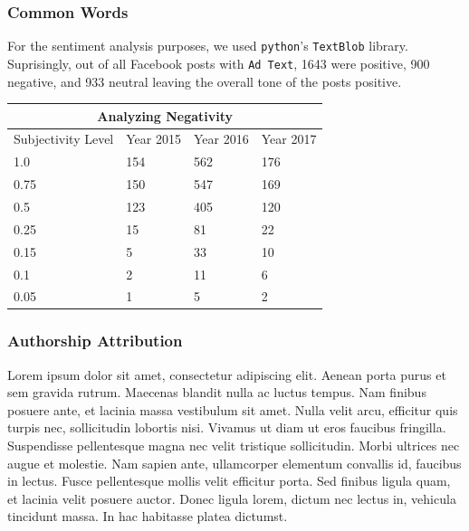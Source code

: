 \documentclass[11pt]{article}
\theoremstyle{definition}
\begin{document}
\subsubsection*{\centering Common Words}
For the sentiment analysis purposes, we used \texttt{python}'s \texttt{TextBlob}
library. Suprisingly, out of all Facebook posts with \texttt{Ad Text}, 1643 were
positive, 900 negative, and 933 neutral leaving the overall tone of the posts
positive.

\begin{center}
\begin{tabular}{ |p{3cm}|p{3cm}|p{3cm}|p{3cm}|  }
 \hline
 \multicolumn{4}{|c|}{Analyzing Negativity} \\
 \hline
 Subjectivity Level & Year 2015 & Year 2016 & Year 2017\\
 \hline
 1.0  & 154 & 562 & 176\\
 0.75 & 150 & 547 & 169\\
 0.5  & 123 & 405 & 120\\
 0.25 & 15  & 81  & 22 \\
 0.15 & 5   & 33  & 10 \\
 0.1  & 2   & 11  & 6  \\
 0.05 & 1   & 5   & 2  \\
 \hline
\end{tabular}
\end{center}



\subsubsection*{\centering Authorship Attribution}

Lorem ipsum dolor sit amet, consectetur adipiscing elit.
Aenean porta purus et sem gravida rutrum.
Maecenas blandit nulla ac luctus tempus.
Nam finibus posuere ante, et lacinia massa vestibulum sit amet.
Nulla velit arcu, efficitur quis turpis nec, sollicitudin lobortis nisi.
Vivamus ut diam ut eros faucibus fringilla.
Suspendisse pellentesque magna nec velit tristique sollicitudin.
Morbi ultrices nec augue et molestie.
Nam sapien ante, ullamcorper elementum convallis id, faucibus in lectus.
Fusce pellentesque mollis velit efficitur porta.
Sed finibus ligula quam, et lacinia velit posuere auctor.
Donec ligula lorem, dictum nec lectus in, vehicula tincidunt massa.
In hac habitasse platea dictumst.
\end{document}
